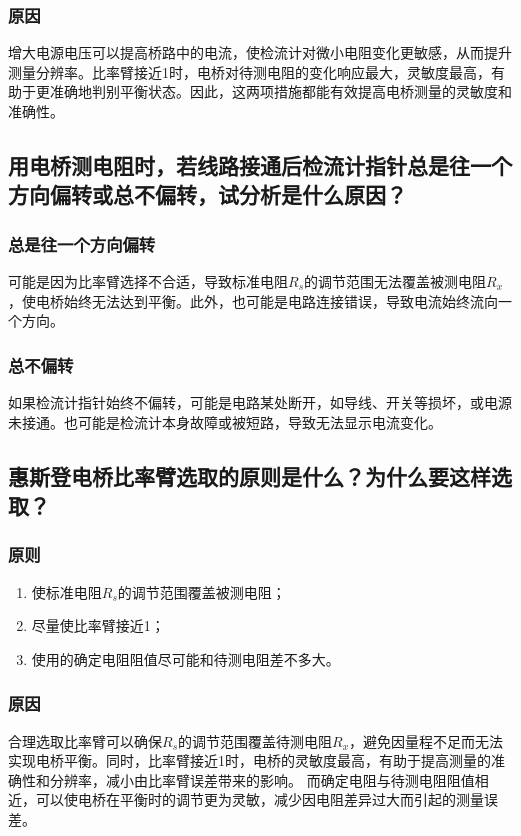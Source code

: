 \documentclass[]{../../templates/Report}%
\begin{document}
\begin{fullreportonly}
\subsubsection{原因}
增大电源电压可以提高桥路中的电流，使检流计对微小电阻变化更敏感，从而提升测量分辨率。比率臂接近1时，电桥对待测电阻的变化响应最大，灵敏度最高，有助于更准确地判别平衡状态。因此，这两项措施都能有效提高电桥测量的灵敏度和准确性。

\subsection{用电桥测电阻时，若线路接通后检流计指针总是往一个方向偏转或总不偏转，试分析是什么原因？}
\subsubsection{总是往一个方向偏转}
可能是因为比率臂选择不合适，导致标准电阻$R_s$的调节范围无法覆盖被测电阻$R_x$，使电桥始终无法达到平衡。此外，也可能是电路连接错误，导致电流始终流向一个方向。
\subsubsection{总不偏转}
如果检流计指针始终不偏转，可能是电路某处断开，如导线、开关等损坏，或电源未接通。也可能是检流计本身故障或被短路，导致无法显示电流变化。

\subsection{惠斯登电桥比率臂选取的原则是什么？为什么要这样选取？}
\subsubsection{原则}
\begin{enumerate}
    \item 使标准电阻$R_s$的调节范围覆盖被测电阻；
    \item 尽量使比率臂接近1；
    \item 使用的确定电阻阻值尽可能和待测电阻差不多大。
\end{enumerate}
\subsubsection{原因}
合理选取比率臂可以确保$R_s$的调节范围覆盖待测电阻$R_x$，避免因量程不足而无法实现电桥平衡。同时，比率臂接近1时，电桥的灵敏度最高，有助于提高测量的准确性和分辨率，减小由比率臂误差带来的影响。
而确定电阻与待测电阻阻值相近，可以使电桥在平衡时的调节更为灵敏，减少因电阻差异过大而引起的测量误差。

\end{fullreportonly}
\end{document}

